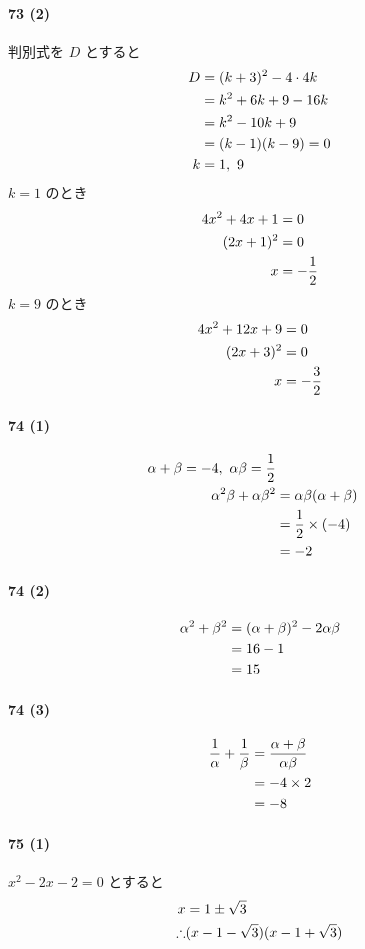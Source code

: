 \documentclass[fleqn,a4j,dvipdfmx,uplatex,twocolumn]{jsarticle}
\def\nr{\notag\\}%
\begin{document}
\paragraph{73 (2)}
判別式を $D$ とすると
\begin{align*}
  D &= (k + 3)^2 - 4 \cdot 4k \nr
  &= k^2 + 6k + 9 - 16k \nr
  &= k^2 - 10k + 9 \nr
  &= (k - 1)(k - 9) = 0 \nr
  k &= 1, \ 9
\end{align*}
$k = 1$ のとき
\begin{align*}
  4x^2 + 4x + 1 &= 0 \nr
  (2x + 1)^2 &= 0 \nr
  x &= -\frac{1}{2}
\end{align*}
$k = 9$ のとき
\begin{align*}
  4x^2 + 12x + 9 &= 0 \nr
  (2x + 3)^2 &= 0 \nr
  x &= -\frac{3}{2}
\end{align*}

\paragraph{74 (1)}
\begin{align*}
  \alpha + \beta = -4, \ \alpha \beta = \frac{1}{2} \nr
  \alpha^2 \beta + \alpha \beta^2 &= \alpha \beta (\alpha + \beta) \\
  &= \frac{1}{2} \times (-4) \\
  &= -2
\end{align*}

\paragraph{74 (2)}
\begin{align*}
  \alpha^2 + \beta^2 &= (\alpha + \beta)^2 - 2\alpha \beta \nr
  &= 16 - 1 \nr
  &= 15 
\end{align*}

\paragraph{74 (3)}
\begin{align*}
  \frac{1}{\alpha} + \frac{1}{\beta} &= \frac{\alpha + \beta}{\alpha \beta} \nr
  &= -4 \times 2 \nr
  &= -8 
\end{align*}

\paragraph{75 (1)}
$x^2 - 2x - 2 = 0$ とすると 
\begin{align*}
  x &= 1 \pm \sqrt{3} \nr
  \therefore &(x - 1 - \sqrt{3})(x - 1 + \sqrt{3}) 
\end{align*}
\end{document}
